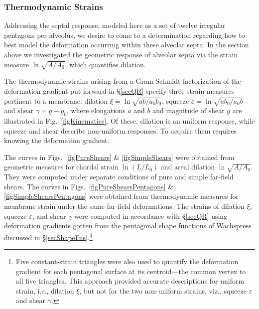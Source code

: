 \subsubsection{Thermodynamic Strains}

Addressing the septal response, modeled here as a set of twelve irregular pentagons per alveolus, we desire to come to a determination regarding how to best model the deformation occurring within these alveolar septa.  In the section above we investigated the geometric response of alveolar septa via the strain measure $\ln \sqrt{A/A_0}$, which quantifies dilation.  

The thermo\-dynamic strains arising from a Gram-Schmidt factorization of the deformation gradient put forward in \S\ref{secQR} specify three strain measures pertinent to a membrane: dilation $\xi = \ln \sqrt{ab/a_0 b_0}$, squeeze $\varepsilon = \ln \sqrt{ab_0 / a_0 b}$ and shear $\gamma = g - g_0$, where elongations $a$ and $b$ and magnitude of shear $g$ are illustrated in Fig.~\ref{figKinematics}.  Of these, dilation is an uniform response, while squeeze and shear describe non-uniform responses.  To acquire them requires knowing the deformation gradient.

The curves in Figs.~\ref{figPureShears} \& \ref{figSimpleShears} were obtained from geometric measures for chordal strain $\ln (L/L_0)$ and areal dilation $\ln \sqrt{A/A_0}$.  They were computed under separate conditions of pure and simple far-field shears.  The curves in Figs.~\ref{figPureShearsPentagons} \& \ref{figSimpleShearsPentagons} were obtained from thermo\-dynamic measures for membrane strain under the same far-field deformations.  The strains of dilation $\xi$, squeeze $\varepsilon$, and shear $\gamma$ were computed in accordance with \S\ref{secQR} using deformation gradients gotten from the pentagonal shape functions of Wachspress \cite{Wachspress75} discussed in \S\ref{secShapeFns}.\footnote{
	Five constant-strain triangles were also used to quantify the deformation gradient for each pentagonal surface at its centroid---the common vertex to all five triangles.  This approach provided accurate descriptions for uniform strain, i.e., dilation $\xi$, but not for the two non-uniform strains, viz., squeeze $\varepsilon$ and shear $\gamma$.
} 

